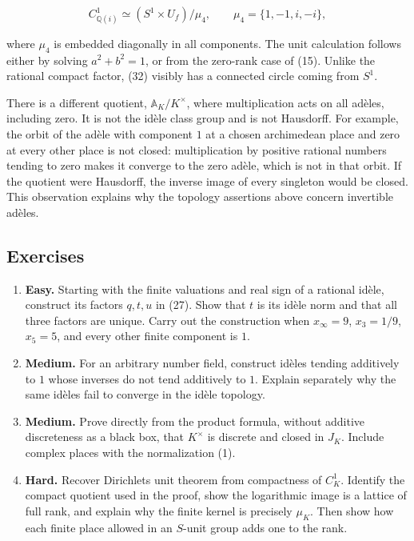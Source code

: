 \documentclass[
  english,
  11pt,
  a4paper,
]{article}
\begin{document}
\[C_{\mathbb Q(i)}^1\simeq (S^1\times U_f)/\mu_4,
\qquad \mu_4=\{1,-1,i,-i\},
\tag{32}\]

where \(\mu_4\) is embedded diagonally in all components. The unit
calculation follows either by solving \(a^2+b^2=1\), or from the
zero-rank case of (15). Unlike the rational compact factor, (32) visibly
has a connected circle coming from \(S^1\).

There is a different quotient, \(\mathbb A_K/K^\times\), where
multiplication acts on all adèles, including zero. It is not the idèle
class group and is not Hausdorff. For example, the orbit of the adèle
with component \(1\) at a chosen archimedean place and zero at every
other place is not closed: multiplication by positive rational numbers
tending to zero makes it converge to the zero adèle, which is not in
that orbit. If the quotient were Hausdorff, the inverse image of every
singleton would be closed. This observation explains why the topology
assertions above concern invertible adèles.

\subsection{Exercises}\label{NT-ADL-03--exercises}

\begin{enumerate}
\item
  \textbf{Easy.} Starting with the finite valuations and real sign of a
  rational idèle, construct its factors \(q,t,u\) in (27). Show that
  \(t\) is its idèle norm and that all three factors are unique. Carry
  out the construction when \(x_\infty=9\), \(x_3=1/9\), \(x_5=5\), and
  every other finite component is \(1\).
\item
  \textbf{Medium.} For an arbitrary number field, construct idèles
  tending additively to \(1\) whose inverses do not tend additively to
  \(1\). Explain separately why the same idèles fail to converge in the
  idèle topology.
\item
  \textbf{Medium.} Prove directly from the product formula, without
  additive discreteness as a black box, that \(K^\times\) is discrete
  and closed in \(J_K\). Include complex places with the normalization
  (1).
\item
  \textbf{Hard.} Recover Dirichlet\textquotesingle s unit theorem from
  compactness of \(C_K^1\). Identify the compact quotient used in the
  proof, show the logarithmic image is a lattice of full rank, and
  explain why the finite kernel is precisely \(\mu_K\). Then show how
  each finite place allowed in an \(S\)-unit group adds one to the rank.
\end{enumerate}
\end{document}
